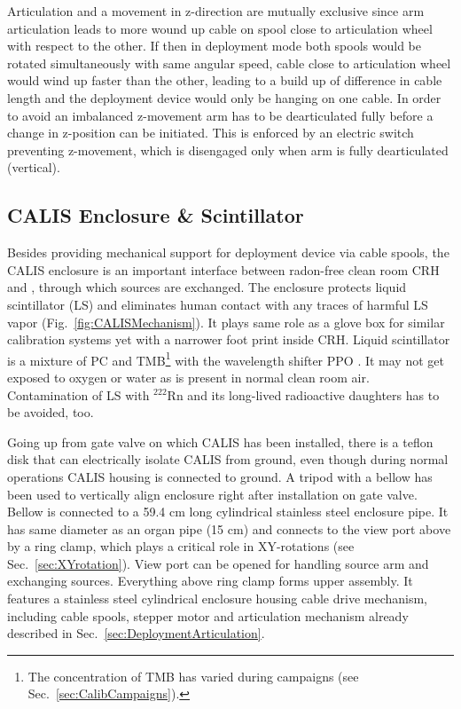 Articulation and a movement in z-direction are mutually exclusive since arm articulation leads to more wound up cable on spool close to articulation wheel with respect to the other. If then in deployment mode both spools would be rotated simultaneously with same angular speed, cable close to articulation wheel would wind up faster than the other, leading to a build up of difference in cable length and the deployment device would only be hanging on one cable. In order to avoid an imbalanced z-movement arm has to be dearticulated fully before a change in z-position can be initiated. This is enforced by an electric switch preventing z-movement, which is disengaged only when arm is fully dearticulated (vertical). 


\subsection{CALIS Enclosure \& Scintillator}

Besides providing mechanical support for deployment device via cable spools, the CALIS enclosure is an important interface between radon-free clean room CRH and \lsv, through which sources are exchanged. 
The enclosure protects liquid scintillator (LS) and eliminates human contact with any traces of harmful LS vapor (Fig.~\ref{fig:CALISMechanism}). It plays same role as a glove box for similar calibration systems yet with a narrower foot print inside CRH. Liquid scintillator is a mixture of PC and TMB\footnote{The concentration of TMB has varied during campaigns (see Sec.~\ref{sec:CalibCampaigns}).} with the wavelength shifter PPO \cite{Agnes:2015qyz}. %
It may not get exposed to oxygen or water as is present in normal clean room air. Contamination of LS with $^{222}$Rn and its long-lived radioactive daughters has to be avoided, too. 

Going up from gate valve on which CALIS has been installed, there is a teflon disk that can electrically isolate CALIS from ground, even though during normal operations CALIS housing is connected to ground. A tripod with a bellow has been used to vertically align enclosure right after installation on gate valve. Bellow is connected to a 59.4 cm long cylindrical stainless steel enclosure pipe. It has same diameter as an organ pipe (15 cm) and connects to the view port above by a ring clamp, which plays a critical role in XY-rotations (see Sec.~\ref{sec:XYrotation}). View port can be opened for handling source arm and exchanging sources. Everything above ring clamp forms upper assembly. It features a stainless steel cylindrical enclosure housing cable drive mechanism, including cable spools, stepper motor and articulation mechanism already described in Sec.~\ref{sec:DeploymentArticulation}. 

